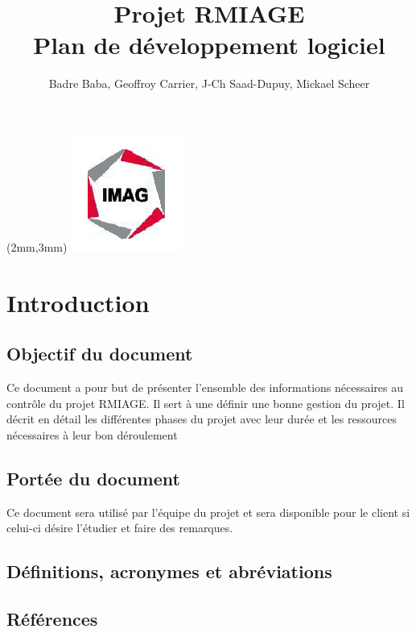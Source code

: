 \documentclass[a4paper,10pt,twoside]{article}
\begin{document}
\title{Projet RMIAGE\\ \Huge{Plan de développement logiciel} }
\author{
	Badre Baba, Geoffroy Carrier, J-Ch Saad-Dupuy, Mickael Scheer
}

\begin{center}
\begin{textblock*}{35cm}(2mm,3mm)
\includegraphics[scale=0.8]{../cc/imag_logo.png}
\end{textblock*}
\end{center}
 
\maketitle


\section{Introduction}
\subsection{Objectif du document}
Ce document a pour but de présenter l'ensemble des informations nécessaires au
contrôle du projet RMIAGE. Il sert à une définir une bonne gestion du projet.
Il décrit en détail les différentes phases du projet avec leur durée et les ressources nécessaires à leur bon 	déroulement

\subsection{Portée du document}
Ce document sera utilisé par l’équipe du projet et sera disponible pour le client si celui-ci désire l’étudier et faire des remarques. 

\subsection{Définitions, acronymes et abréviations}
\subsection{Références}
\end{document}
